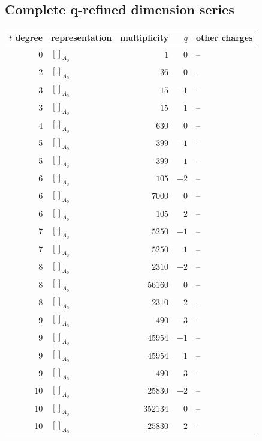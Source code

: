 \documentclass[11pt]{article}
\newcommand{\Dynkin}[1]{#1}
\begin{document}
\subsection{Complete q-refined dimension series}
\begin{longtable}{r l r r l}
\toprule $t$ degree & representation & multiplicity & $q$ & other charges\\\midrule\endhead
0 & $\Dynkin{[]_{A_0}}$ & $1$ & $0$ & --\\
2 & $\Dynkin{[]_{A_0}}$ & $36$ & $0$ & --\\
3 & $\Dynkin{[]_{A_0}}$ & $15$ & $-1$ & --\\
3 & $\Dynkin{[]_{A_0}}$ & $15$ & $1$ & --\\
4 & $\Dynkin{[]_{A_0}}$ & $630$ & $0$ & --\\
5 & $\Dynkin{[]_{A_0}}$ & $399$ & $-1$ & --\\
5 & $\Dynkin{[]_{A_0}}$ & $399$ & $1$ & --\\
6 & $\Dynkin{[]_{A_0}}$ & $105$ & $-2$ & --\\
6 & $\Dynkin{[]_{A_0}}$ & $7000$ & $0$ & --\\
6 & $\Dynkin{[]_{A_0}}$ & $105$ & $2$ & --\\
7 & $\Dynkin{[]_{A_0}}$ & $5250$ & $-1$ & --\\
7 & $\Dynkin{[]_{A_0}}$ & $5250$ & $1$ & --\\
8 & $\Dynkin{[]_{A_0}}$ & $2310$ & $-2$ & --\\
8 & $\Dynkin{[]_{A_0}}$ & $56160$ & $0$ & --\\
8 & $\Dynkin{[]_{A_0}}$ & $2310$ & $2$ & --\\
9 & $\Dynkin{[]_{A_0}}$ & $490$ & $-3$ & --\\
9 & $\Dynkin{[]_{A_0}}$ & $45954$ & $-1$ & --\\
9 & $\Dynkin{[]_{A_0}}$ & $45954$ & $1$ & --\\
9 & $\Dynkin{[]_{A_0}}$ & $490$ & $3$ & --\\
10 & $\Dynkin{[]_{A_0}}$ & $25830$ & $-2$ & --\\
10 & $\Dynkin{[]_{A_0}}$ & $352134$ & $0$ & --\\
10 & $\Dynkin{[]_{A_0}}$ & $25830$ & $2$ & --\\
\bottomrule\end{longtable}
\end{document}
